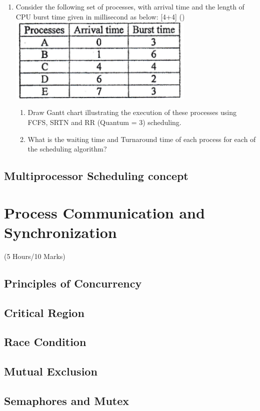 \documentclass[12pt]{article}
\begin{document}
\begin{enumerate}
	\item Consider the following set of processes, with arrival time and the length of CPU burst time given in millisecond as below: \hfill [4+4] ()
	\includegraphics[width=3.5in]{os_9}
	\begin{enumerate}[noitemsep, topsep = 0pt, label = \alph*.]
		\item Draw Gantt chart illustrating the execution of these processes using FCFS, SRTN and RR (Quantum = 3) scheduling.
		\item What is the waiting time and Turnaround time of each process for each of the scheduling algorithm?
	\end{enumerate}
		
\end{enumerate}
\subsection{Multiprocessor Scheduling concept}

\pagebreak
\section{Process Communication and Synchronization}
\begin{center}(5 Hours/10 Marks)\end{center}
\subsection{Principles of Concurrency}
\subsection{Critical Region}
\subsection{Race Condition}
\subsection{Mutual Exclusion}
\subsection{Semaphores and Mutex}
\end{document}
